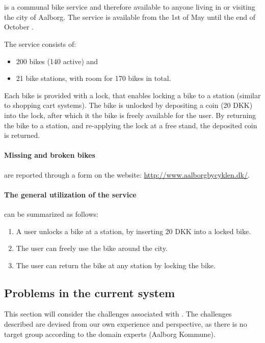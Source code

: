 \section{\citybike}\label{aalborg_bycyklen}
\citybike is a communal bike service and therefore available to anyone living in or visiting the city of Aalborg.
The service is available from the 1st of May until the end of October \cite{aalborgbycyklenbagcyklen}.

\noindent The service consists of:
\begin{itemize}
\item 200 bikes (140 active) and 
\item 21 bike stations, with room for 170 bikes in total.
\end{itemize}
Each bike is provided with a lock, that enables locking a bike to a station (similar to shopping cart systems).
The bike is unlocked by depositing a coin (20 DKK) into the lock, after which it the bike is freely available for the user.
By returning the bike to a station, and re-applying the lock at a free stand, the deposited coin is returned.

\paragraph{Missing and broken bikes} are reported through a form on the \citybike website: \url{http://www.aalborgbycyklen.dk/}.

\paragraph{The general utilization of the service} can be summarized as follows:
\begin{enumerate}
\item A user unlocks a bike at a station, by inserting 20 DKK into a locked bike.
\item The user can freely use the bike around the city.
\item The user can return the bike at any station by locking the bike.
\end{enumerate}

\subsection{Problems in the current system} \label{aalborg_bycyklen:challenges}
This section will consider the challenges associated with \citybike.
The challenges described are devised from our own experience and perspective, as there is no target group according to the domain experts (Aalborg Kommune).

